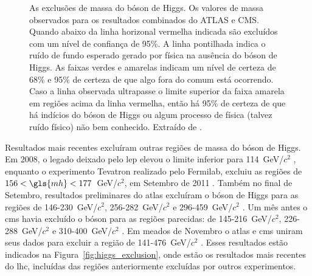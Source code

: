 \begin{figure}[t!]
\begin{center}
    \end{center}
\caption[Exclusões de massa do Higgs realizada pela combinação dos dados do
ATLAS e CMS. As exclusões de massa do Tevatron e LEP também estão indicadas.]{As exclusões de massa do bóson de Higgs. Os valores de massa
observados para os resultados combinados do ATLAS e CMS. Quando
abaixo da linha horizonal vermelha indicada são excluídos com um nível de
confiança de 95\%. A linha pontilhada indica o ruído de fundo esperado gerado
por física na ausência do bóson de Higgs. As faixas verdes e amarelas indicam
um nível de certeza de 68\% e 95\% de certeza de que algo fora do comum está
ocorrendo. Caso a linha observada ultrapasse o limite superior da faixa amarela
em regiões acima da linha vermelha, então há 95\% de certeza de que há indícios
do bóson de Higgs ou algum processo de física (talvez ruído físico) não bem
conhecido. Extraído de \cite{atlas_cms_higgs}.}
\end{figure}

Resultados mais recentes excluíram outras regiões de massa do bóson de Higgs. Em 2008, 
o legado deixado pelo \gls{lep} elevou o limite inferior para 114~GeV/$c^2$
\cite{lep_higgs_2008}, enquanto o experimento Tevatron realizado pelo Fermilab, excluiu as
regiões de $156 < \gls{mh} < 177$~GeV/$c^2$, em Setembro de 2011
\cite{tevatron_higgs}. Também no final de Setembro, resultados preliminares do
\gls{atlas} excluíram o bóson de Higgs para as regiões de 146-230~GeV/$c^2$, 256-282~GeV/$c^2$ 
e 296-459~GeV/$c^2$ \cite{atlas_higgs}. Um mês antes o \gls{cms} havia excluído o bóson para
as regiões parecidas: de 145-216~GeV/$c^2$, 226-288~GeV/$c^2$ e 310-400~GeV/$c^2$
\cite{cms_higgs}. Em meados de Novembro o \gls{atlas} e \gls{cms} uniram seus
dados para excluir a região de 141-476~GeV/$c^2$ \cite{atlas_cms_higgs}. Esses
resultados estão indicados na Figura~\ref{fig:higgs_exclusion}, onde estão os
resultados mais recentes do \gls{lhc}, incluídas das regiões anteriormente
excluídas por outros experimentos.


